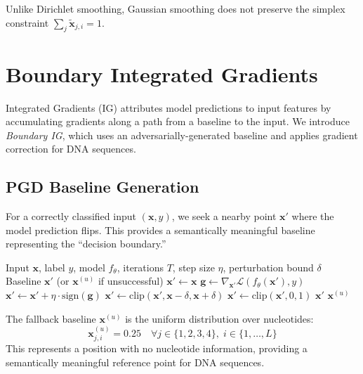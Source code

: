 \documentclass[11pt]{article}
\newcommand{\x}{\mathbf{x}}
\newcommand{\loss}{\mathcal{L}}
\newcommand{\model}{f_\theta}
\theoremstyle{definition}
\begin{document}
Unlike Dirichlet smoothing, Gaussian smoothing does not preserve the simplex constraint $\sum_j \tilde{\x}_{j,i} = 1$.

\section{Boundary Integrated Gradients}

Integrated Gradients (IG) attributes model predictions to input features by accumulating gradients along a path from a baseline to the input. We introduce \emph{Boundary IG}, which uses an adversarially-generated baseline and applies gradient correction for DNA sequences.

\subsection{PGD Baseline Generation}

For a correctly classified input $(\x, y)$, we seek a nearby point $\x'$ where the model prediction flips. This provides a semantically meaningful baseline representing the ``decision boundary.''

\begin{algorithm}[H]
\caption{PGD Baseline Search}
\label{alg:pgd-baseline}
\begin{algorithmic}[1]
\REQUIRE Input $\x$, label $y$, model $\model$, iterations $T$, step size $\eta$, perturbation bound $\delta$
\ENSURE Baseline $\x'$ (or $\x^{(u)}$ if unsuccessful)
\STATE $\x' \gets \x$
    \STATE $\mathbf{g} \gets \nabla_{\x'} \loss(\model(\x'), y)$
    \STATE $\x' \gets \x' + \eta \cdot \text{sign}(\mathbf{g})$ 
    \STATE $\x' \gets \text{clip}(\x', \x - \delta, \x + \delta)$ 
    \STATE $\x' \gets \text{clip}(\x', 0, 1)$ 
    \IF{$\text{sign}(\model(\x')) \neq \text{sign}(\model(\x))$}
        \RETURN $\x'$ 
    \ENDIF
\ENDFOR
\RETURN $\x^{(u)}$ 
\end{algorithmic}
\end{algorithm}

The fallback baseline $\x^{(u)}$ is the uniform distribution over nucleotides:
\begin{equation}
    \x^{(u)}_{j,i} = 0.25 \quad \forall j \in \{1,2,3,4\}, \; i \in \{1,\ldots,L\}
\end{equation}
This represents a position with no nucleotide information, providing a semantically meaningful reference point for DNA sequences.
\end{document}
